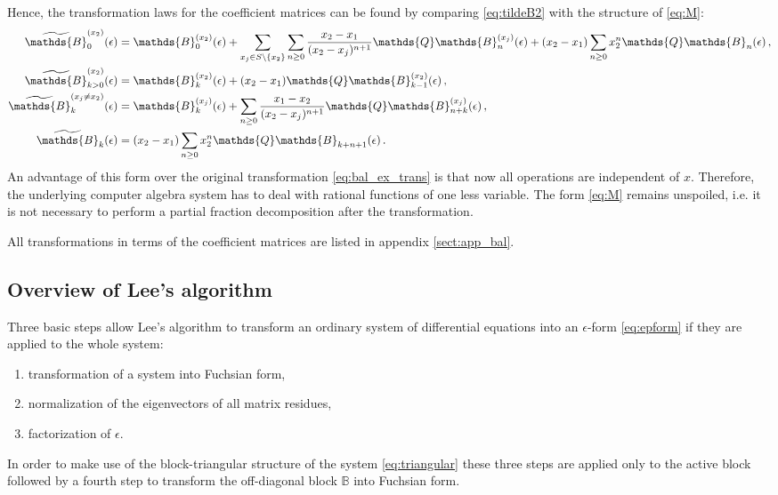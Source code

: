 \documentclass[12pt]{article}
\numberwithin{equation}{section}
\numberwithin{figure}{section}
\newcommand{\B}{\mathds{B}}
\newcommand{\Q}{\mathds{Q}}
\begin{document}
      Hence, the transformation laws for the coefficient matrices can be found by comparing \eqref{eq:tildeB2} with the structure of \eqref{eq:M}:
      \begin{align*}
        \widetilde\B^{(x_2)}_0(\epsilon)
        &=
        \B^{(x_2)}_0(\epsilon)
        +
        \sum\limits_{x_j \in S\backslash\{x_2\}} 
        \sum\limits_{n\geq0} 
        \frac{x_2-x_1}{(x_2-x_j)^{n+1}}
        \Q \B^{(x_j)}_n(\epsilon)
        +
        (x_2-x_1)
        \sum\limits_{n\geq0} 
        x_2^n \Q \B_n(\epsilon)
        \,, \\
        \widetilde\B^{(x_2)}_{k>0}(\epsilon)
        &=
        \B^{(x_2)}_k(\epsilon)
        +
        (x_2-x_1) \Q \B^{(x_2)}_{k-1}(\epsilon)
        \,, \\
        \widetilde\B^{(x_j\neq x_2)}_k(\epsilon)
        &=
        \B^{(x_j)}_k(\epsilon)
        +
        \sum\limits_{n\geq0} 
        \frac{x_1-x_2}{(x_2-x_j)^{n+1}}
        \Q \B^{(x_j)}_{n+k}(\epsilon)
        \,, \\
        \widetilde\B_k(\epsilon)
        &=
        (x_2-x_1)
        \sum\limits_{n\geq0} 
        x_2^n 
        \Q \B_{k+n+1}(\epsilon)
        \,.
      \end{align*}
      An advantage of this form over the original transformation \eqref{eq:bal_ex_trans} is that now all operations are independent of $x$.
      Therefore, the underlying computer algebra system has to deal with rational functions of one less variable.
      The form \eqref{eq:M} remains unspoiled, i.e. it is not necessary to perform a partial fraction decomposition after the transformation.

      All transformations in terms of the coefficient matrices are listed in appendix \ref{sect:app_bal}.
    \subsection{Overview of Lee's algorithm} \label{sect:lee}
      Three basic steps allow Lee's algorithm\cite{Lee:2014ioa} to transform an ordinary system of differential equations into an $\epsilon$-form \eqref{eq:epform} if they are applied to the whole system:
      \begin{enumerate}
        \item transformation of a system into Fuchsian form,
        \item normalization of the eigenvectors of all matrix residues,
        \item factorization of $\epsilon$.
      \end{enumerate}
      In order to make use of the block-triangular structure of the system \eqref{eq:triangular} these three steps are applied only to the active block followed by a fourth step to transform the off-diagonal block $\B$ into Fuchsian form.
\end{document}
